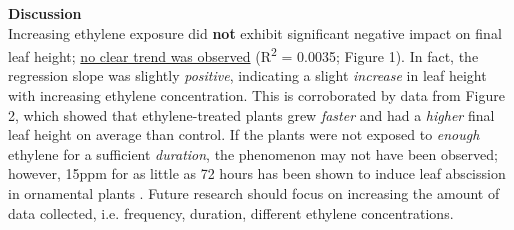 \documentclass{report}
\begin{document}
\begin{multicols}{3}
  \textbf{Discussion}\\
  Increasing ethylene exposure did \textbf{not} exhibit significant negative impact on final leaf height; \uline{no clear trend was observed} (R\textsuperscript{2} = 0.0035; Figure 1). In fact, the regression slope was slightly \textit{positive}, indicating a slight \textit{increase} in leaf height with increasing ethylene concentration. This is corroborated by data from Figure 2, which showed that ethylene-treated plants grew \textit{faster} and had a \textit{higher} final leaf height on average than control. If the plants were not exposed to \textit{enough} ethylene for a sufficient \textit{duration}, the phenomenon may not have been observed; however, 15ppm for as little as 72 hours has been shown to induce leaf abscission in ornamental plants \parencite{abscission}. Future research should focus on increasing the amount of data collected, i.e. frequency, duration, different ethylene concentrations.
  
\end{multicols}

\clearpage


\printbibliography
\end{document}
